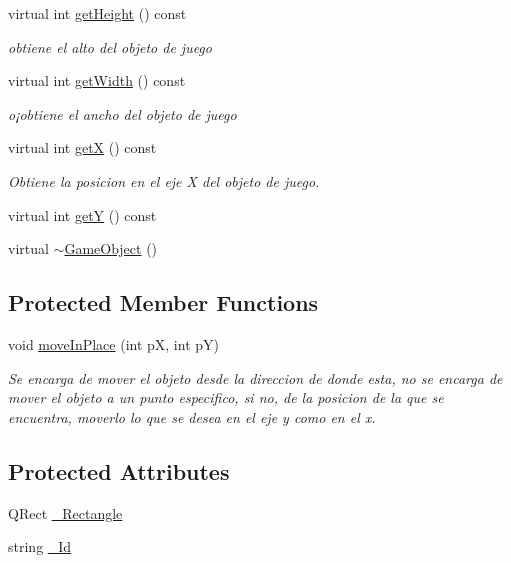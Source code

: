 \begin{DoxyCompactItemize}
virtual int \hyperlink{class_game_object_a2553f445dc1aa30defaa3bc0875927ba}{get\-Height} () const 
\begin{DoxyCompactList}\small\item\em obtiene el alto del objeto de juego \end{DoxyCompactList}\item 
virtual int \hyperlink{class_game_object_a3c6c20c513c069dc2cf6aee2649581b2}{get\-Width} () const 
\begin{DoxyCompactList}\small\item\em o¡obtiene el ancho del objeto de juego \end{DoxyCompactList}\item 
virtual int \hyperlink{class_game_object_a8f9c430b6cef5177a0a7f8649e749d10}{get\-X} () const 
\begin{DoxyCompactList}\small\item\em Obtiene la posicion en el eje X del objeto de juego. \end{DoxyCompactList}\item 
virtual int \hyperlink{class_game_object_a3ae8f58696691791813f0c58af6fffd8}{get\-Y} () const 
\item 
virtual \hyperlink{class_game_object_ab82dfdb656f9051c0587e6593b2dda97}{$\sim$\-Game\-Object} ()
\end{DoxyCompactItemize}
\subsection*{Protected Member Functions}
\begin{DoxyCompactItemize}
\item 
void \hyperlink{class_game_object_ae8bb850eb78ebf34e764b8dbd3ea5fab}{move\-In\-Place} (int p\-X, int p\-Y)
\begin{DoxyCompactList}\small\item\em Se encarga de mover el objeto desde la direccion de donde esta, no se encarga de mover el objeto a un punto especifico, si no, de la posicion de la que se encuentra, moverlo lo que se desea en el eje y como en el x. \end{DoxyCompactList}\end{DoxyCompactItemize}
\subsection*{Protected Attributes}
\begin{DoxyCompactItemize}
\item 
Q\-Rect \hyperlink{class_game_object_a38a2dff83aae28ebffee5c4b833626a2}{\-\_\-\-Rectangle}
\item 
string \hyperlink{class_game_object_a74075bae5de6b22a17098e60964e676b}{\-\_\-\-Id}
\end{DoxyCompactItemize}
